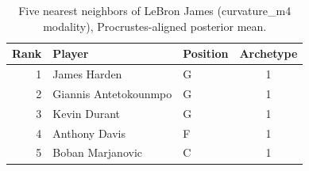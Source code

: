 \begin{table}[htbp]
  \centering\small
  \begin{tabular}{rllc}
    \toprule
    Rank & Player & Position & Archetype \\
    \midrule
    1 & James Harden & G & 1 \\
    2 & Giannis Antetokounmpo & G & 1 \\
    3 & Kevin Durant & G & 1 \\
    4 & Anthony Davis & F & 1 \\
    5 & Boban Marjanovic & C & 1 \\
    \bottomrule
  \end{tabular}
  \caption{Five nearest neighbors of LeBron James (curvature_m4 modality), Procrustes-aligned posterior mean.}
  \label{tab:LeBron_James_neighbors_curvature_m4}
\end{table}

